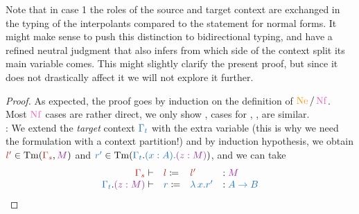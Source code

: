 \documentclass[a4paper,UKenglish,cleveref, autoref, thm-restate]{lipics-v2021}
\begin{document}
Note that in case 1 the roles of the source and target context
are exchanged in the typing of the interpolants compared
to the statement for normal forms.
It might make sense to push this distinction to bidirectional typing,
and have a refined neutral judgment that also infers from which
side of the context split its main variable comes. This might slightly clarify
the present proof, but since it does not drastically affect it we will not
explore it further.

\begin{proof}
As expected, the proof goes by induction on the definition of \(\Ne/\Nf\).\\
  Most \(\Nf\) cases are rather direct, we only show 
  , cases for , ,  are similar. \\
  : We extend the \emph{target} context \(\tcol{\Gamma_{t}}\)
  with the extra variable (this is why we need the formulation with a context partition!)
  and by induction hypothesis, we obtain
  \(\scol{l'} \in \Tm(\scol{\Gamma_{s}},\mcol{M})\) and
  \(\tcol{r'} \in \Tm(\tcol{\Gamma_{t}}.\tcol{(x : A).\mcol{(z : M)}})\),
  and we can take
  \[\begin{array}{rlll}
  \scol{\Gamma_{s}} \vdash & \scol{l} \coloneq & \scol{l'} & \ty \mcol{M} \\
  \tcol{\Gamma_{t}}.\mcol{(z : M)} \vdash & \tcol{r} \coloneq &
    \tcol{\l x.r'} &
    \ty \tcol{A \to B}
  \end{array}\]


\end{proof}
\end{document}

